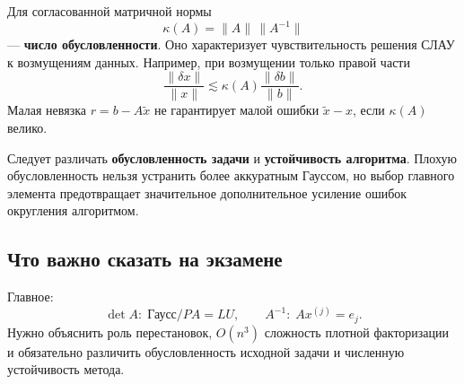 Для согласованной матричной нормы
\[
\kappa(A)=\|A\|\,\|A^{-1}\|
\]
--- \textbf{число обусловленности}. Оно характеризует чувствительность решения СЛАУ к возмущениям данных. Например, при возмущении только правой части
\[
\frac{\|\delta x\|}{\|x\|}
\lesssim
\kappa(A)\frac{\|\delta b\|}{\|b\|}.
\]
Малая невязка $r=b-A\tilde x$ не гарантирует малой ошибки $\tilde x-x$, если $\kappa(A)$ велико.

Следует различать \textbf{обусловленность задачи} и \textbf{устойчивость алгоритма}. Плохую обусловленность нельзя устранить более аккуратным Гауссом, но выбор главного элемента предотвращает значительное дополнительное усиление ошибок округления алгоритмом.

\subsection{Что важно сказать на экзамене}

Главное:
\[
\boxed{
\det A:\; \text{Гаусс}/PA=LU,
\qquad
A^{-1}:\; Ax^{(j)}=e_j.
}
\]
Нужно объяснить роль перестановок, $O(n^3)$ сложность плотной факторизации и обязательно различить обусловленность исходной задачи и численную устойчивость метода.

\newpage
